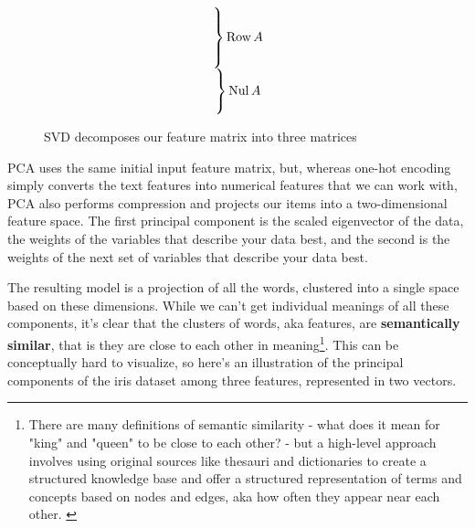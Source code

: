 \documentclass[11pt, table]{diazessay} %
\begin{document}
\begin{sloppypar}
\begin{figure}[H]
{\[  \begin{matrix}
    \left.\vphantom{\begin{bmatrix}
       \vect v_1^T \\ \vect v_2^T \\ \dots \\ \vect v_r^T 
       \end{bmatrix}}\right\}\row A \\ 
    \left.\vphantom{\begin{bmatrix}
      \vect v_{r+1}^T \\ \dots \\ \vect v_n^T 
    \end{bmatrix}}\right\}\nul A
  \end{matrix}
\] 
}
\caption{SVD decomposes our feature matrix into three matrices}
\end{figure}


PCA uses the same initial input feature matrix, but, whereas one-hot encoding simply converts the text features into numerical features that we can work with, PCA also performs compression and projects our items into a two-dimensional feature space.  The first principal component is the scaled eigenvector of the data, the weights of the variables that describe your data best, and the second is the weights of the next set of variables that describe your data best. 

The resulting model is a projection of all the words, clustered into a single space based on these dimensions. While we can't get individual meanings of all these components, it’s clear that the clusters of words, aka features, are \textbf{semantically similar}, that is they are close to each other in meaning\footnote{There are many definitions of semantic similarity - what does it mean for "king" and "queen" to be close to each other? - but a high-level approach involves using original sources like thesauri and dictionaries to create a structured knowledge base and offer a structured representation of terms and concepts based on nodes and edges, aka how often they appear near each other. \cite{chandrasekaran2021evolution}}. This can be conceptually hard to visualize, so here's an illustration of the principal components of the iris dataset among three features, represented in two vectors. 


\end{sloppypar}
\end{document}
